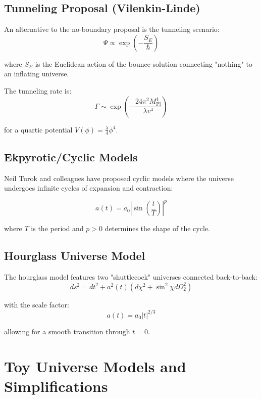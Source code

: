 \documentclass[12pt,a4paper]{article}
\begin{document}
\subsection{Tunneling Proposal (Vilenkin-Linde)}

An alternative to the no-boundary proposal is the tunneling scenario:
\begin{equation}
\Psi \propto \exp\left(-\frac{S_E}{\hbar}\right)
\end{equation}

where $S_E$ is the Euclidean action of the bounce solution connecting "nothing" to an inflating universe.

The tunneling rate is:
\begin{equation}
\Gamma \sim \exp\left(-\frac{24\pi^2 M_{\text{Pl}}^4}{\lambda v^4}\right)
\end{equation}

for a quartic potential $V(\phi) = \frac{\lambda}{4}\phi^4$.

\subsection{Ekpyrotic/Cyclic Models}

Neil Turok and colleagues have proposed cyclic models where the universe undergoes infinite cycles of expansion and contraction:

\begin{equation}
a(t) = a_0 \left|\sin\left(\frac{t}{T}\right)\right|^p
\end{equation}

where $T$ is the period and $p > 0$ determines the shape of the cycle.

\subsection{Hourglass Universe Model}

The hourglass model features two "shuttlecock" universes connected back-to-back:
\begin{equation}
ds^2 = dt^2 + a^2(t)(d\chi^2 + \sin^2\chi d\Omega_2^2)
\end{equation}

with the scale factor:
\begin{equation}
a(t) = a_0 |t|^{2/3}
\end{equation}

allowing for a smooth transition through $t = 0$.

\section{Toy Universe Models and Simplifications}
\end{document}
